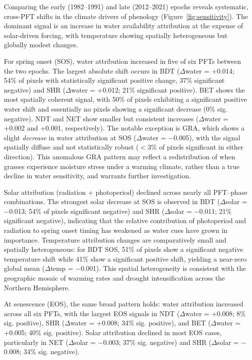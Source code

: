 \documentclass[pdflatex,sn-mathphys-num]{sn-jnl}%
\theoremstyle{thmstyleone}%
\theoremstyle{thmstyletwo}%
\theoremstyle{thmstylethree}%
\begin{document}
Comparing the early (1982--1991) and late (2012--2021) epochs reveals systematic, cross-PFT shifts in the climate drivers of phenology (Figure~\ref{fig:sensitivity}). The dominant signal is an increase in water availability attribution at the expense of solar-driven forcing, with temperature showing spatially heterogeneous but globally modest changes.

For spring onset (SOS), water attribution increased in five of six PFTs between the two epochs. The largest absolute shift occurs in BDT ($\Delta$water = +0.014; 54\% of pixels with statistically significant positive change, 37\% significant negative) and SHR ($\Delta$water = +0.012; 21\% significant positive). BET shows the most spatially coherent signal, with 50\% of pixels exhibiting a significant positive water shift and essentially no pixels showing a significant decrease (0\% sig. negative). NDT and NET show smaller but consistent increases ($\Delta$water = +0.002 and +0.001, respectively). The notable exception is GRA, which shows a slight \emph{decrease} in water attribution at SOS ($\Delta$water = $-$0.005), with the signal spatially diffuse and not statistically robust ($<$3\% of pixels significant in either direction). This anomalous GRA pattern may reflect a redistribution of when grasses experience moisture stress under a warming climate, rather than a true decline in water sensitivity, and warrants further investigation.

Solar attribution (radiation + photoperiod) declined across nearly all PFT--phase combinations. The strongest solar decrease at SOS is observed in BDT ($\Delta$solar = $-$0.013; 54\% of pixels significant negative) and SHR ($\Delta$solar = $-$0.011; 21\% significant negative), indicating that the relative contribution of photoperiod and radiation to spring onset timing has weakened as water cues have grown in importance. Temperature attribution changes are comparatively small and spatially heterogeneous: for BDT SOS, 51\% of pixels show a significant negative temperature shift while 41\% show a significant positive shift, yielding a near-zero global mean ($\Delta$temp = $-$0.001). This spatial heterogeneity is consistent with the geographic mosaic of warming rates and drought intensification across the Northern Hemisphere.

At senescence (EOS), the same broad pattern holds: water attribution increased across all six PFTs, with the largest EOS signals in NDT ($\Delta$water = +0.008; 8\% sig. positive), SHR ($\Delta$water = +0.008; 34\% sig. positive), and BET ($\Delta$water = +0.005; 40\% sig. positive). Solar attribution declined in most EOS cases, particularly in NET ($\Delta$solar = $-$0.003; 37\% sig. negative) and SHR ($\Delta$solar = $-$0.008; 34\% sig. negative).
\end{document}
